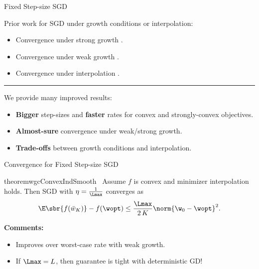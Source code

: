 \documentclass[mathserif,notheorems, hyperref={colorlinks, citecolor=blue, urlcolor=blue, linkcolor=blue}]{beamer}
\begin{document}
\begin{frame}{Fixed Step-size SGD}

	Prior work for SGD under growth conditions or interpolation:
	\begin{itemize}
		\item Convergence under strong growth \citep{tseng1998incremental, solodov1998incremental, schmidt2013fast, cevher2018linear}.
		\item Convergence under weak growth \citep{vaswani2019fast}.
		\item Convergence under interpolation \citep{bassily2018exponential}.
	\end{itemize}
	\vspace{2ex}

	\pause
	\rule{\textwidth}{0.5px}
	\vspace{1ex}

	We provide many improved results:
	\begin{itemize}
		\item \textbf{Bigger} step-sizes and \textbf{faster} rates for convex and strongly-convex objectives.
		\item \textbf{Almost-sure} convergence under weak/strong growth.
		\item \textbf{Trade-offs} between growth conditions and interpolation.
	\end{itemize}
\end{frame}

\begin{frame}{Convergence for Fixed Step-size SGD}

	\begin{restatable}{theorem}{wgcConvexIndSmooth}~\label{thm:wgc-convex-ind-smooth}
		Assume \( f \) is convex and minimizer interpolation holds.
		Then SGD with \( \eta = \frac{1}{\Lmax} \) converges as
		\[ \E\sbr{f(\bar w_K)} - f(\wopt) \leq \frac{\Lmax}{2 \, K} \norm{\w_0 - \wopt}^2.   \]
	\end{restatable}
	\pause

	\textbf{Comments:}
	\begin{itemize}
		\item Improves over worst-case rate with weak growth.
		      \pause
		\item If \( \Lmax = L \), then guarantee is tight with deterministic GD!
	\end{itemize}

\end{frame}

\end{document}
